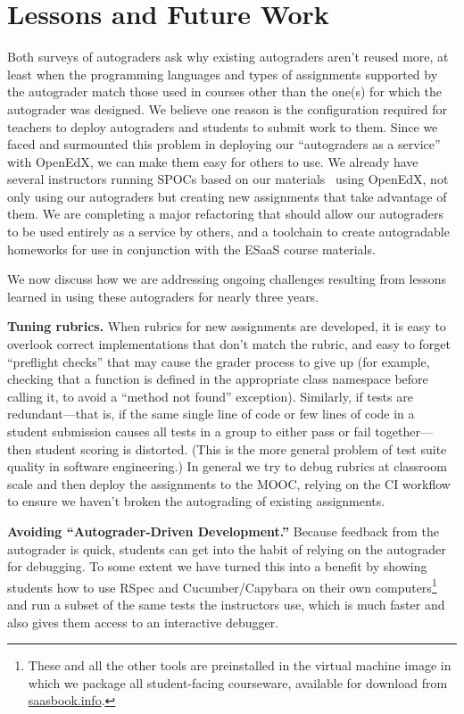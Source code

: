 \section{Lessons and Future Work}

Both  surveys of autograders ask why existing autograders aren't reused
more, at least when the programming languages and types of assignments supported by the
autograder match those used in courses other than the one(s) for which
the autograder was designed.
We believe one reason is the configuration required for teachers to
deploy autograders and
students to submit work to them.  Since we
faced and surmounted this problem in deploying our ``autograders as a
service'' with OpenEdX, we can make them easy for others to use.
We already have several instructors running SPOCs based on our
materials~\cite{moocs-spocs-TR} using OpenEdX, not only using our
autograders but creating new assignments that take advantage of them.
We are completing a major refactoring that should allow our autograders
to be used entirely as a service by others, and a toolchain to create
autogradable homeworks for use in conjunction with the ESaaS course
materials. 

We now discuss how we are addressing ongoing
challenges resulting from lessons learned in using these autograders for
nearly three years.

\textbf{Tuning rubrics.}
When rubrics for new assignments are developed, it is easy to overlook
correct implementations that don't match the rubric, and easy to forget
``preflight checks'' that may cause the grader process to give up (for
example, checking that a function is defined in the appropriate class
namespace before calling it, to avoid a ``method not found''
exception).  Similarly, if tests are
redundant---that is, if the same single line of code or few lines of
code in a student submission causes all tests in a group to either pass
or fail together---then student scoring is distorted.  (This is the more
general problem of test suite quality in software engineering.)
In general we try to debug rubrics at classroom scale and
then deploy the assignments to the MOOC, relying on the CI workflow to
ensure we haven't broken the autograding of existing assignments.

\textbf{Avoiding ``Autograder-Driven Development.''}
Because feedback from the autograder is quick, students can get into the
habit of relying on the autograder for debugging.  To some extent we
have turned this into a benefit by showing students how to use
RSpec and Cucumber/Capybara 
on their own computers\footnote{These and all the other tools are preinstalled in the virtual machine
image in which we package all student-facing courseware, available for
download from \url{saasbook.info}.}
and run a subset of the same tests the
instructors use, which is much faster and also gives them access to an
interactive debugger.


